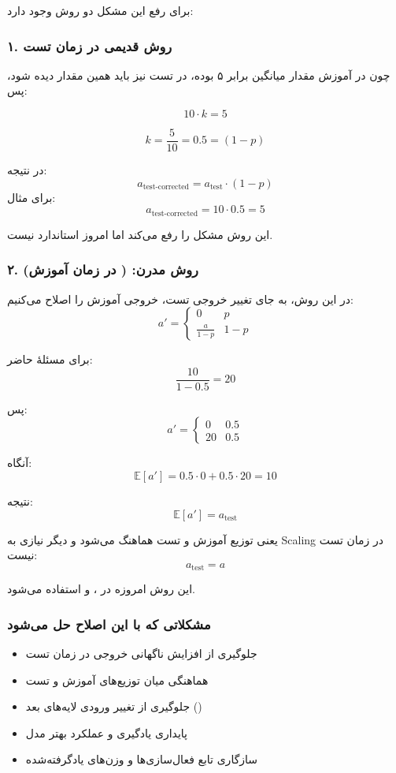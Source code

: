 \documentclass{article}
\begin{document}
برای رفع این مشکل دو روش وجود دارد:

\subsubsection*{۱. روش قدیمی  در زمان تست}

چون در آموزش مقدار میانگین برابر ۵ بوده، در تست نیز باید همین مقدار دیده شود، پس:

\[
10 \cdot k = 5
\]

\[
k = \frac{5}{10} = 0.5 = (1-p)
\]

در نتیجه:
\[
\boxed{a_{\text{test-corrected}} = a_{\text{test}} \cdot (1-p)}
\]
برای مثال:
\[
a_{\text{test-corrected}} = 10 \cdot 0.5 = 5
\]

این روش مشکل  را رفع می‌کند اما امروز استاندارد نیست.


\subsubsection*{۲. روش مدرن:  ( در زمان آموزش)}

در این روش، به جای تغییر خروجی تست، خروجی آموزش را اصلاح می‌کنیم:
\[
a' =
\begin{cases}
	0 & p \\
	\frac{a}{1-p} & 1-p
\end{cases}
\]

برای مسئلهٔ حاضر:
\[
\frac{10}{1-0.5} = 20
\]

پس:
\[
a' =
\begin{cases}
	0 & 0.5 \\
	20 & 0.5
\end{cases}
\]

آنگاه:
\[
\mathbb{E}[a'] = 0.5\cdot 0 + 0.5 \cdot 20 = 10
\]

نتیجه:
\[
\mathbb{E}[a'] = a_{\text{test}}
\]

یعنی توزیع آموزش و تست هماهنگ می‌شود و دیگر نیازی به Scaling در زمان تست نیست:
\[
\boxed{a_{\text{test}} = a}
\]

این روش امروزه در ،  و  استفاده می‌شود.


\subsubsection*{مشکلاتی که با این اصلاح حل می‌شود}
\begin{itemize}
	\item جلوگیری از افزایش ناگهانی خروجی در زمان تست
	\item هماهنگی میان توزیع‌های آموزش و تست
	\item جلوگیری از تغییر ورودی لایه‌های بعد ()
	\item پایداری یادگیری و عملکرد بهتر مدل
	\item سازگاری تابع فعال‌سازی‌ها و وزن‌های یادگرفته‌شده
\end{itemize}
\end{document}

